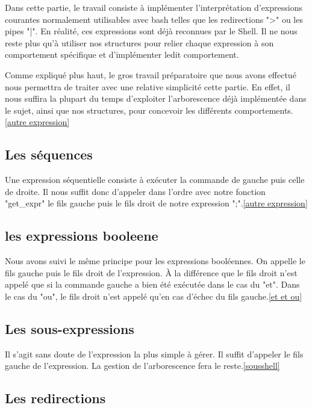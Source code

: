 \documentclass[12pt]{article}
\begin{document}
Dans cette partie, le travail consiste à implémenter l'interprétation d'expressions courantes
normalement utilisables avec bash telles que les redirections ">" ou les pipes "|".
En réalité, ces expressions sont déjà reconnues par le Shell. Il ne nous reste plus qu'à utiliser
nos structures pour relier chaque expression à son comportement spécifique et d'implémenter ledit comportement.

Comme expliqué plus haut, le gros travail préparatoire que nous avons effectué nous permettra
de traiter avec une relative simplicité cette partie. En effet, il nous suffira la plupart du temps 
d'exploiter l'arborescence déjà implémentée dans le sujet, ainsi que nos structures, pour concevoir
les différents comportements.\ref{autre expression}

\subsection{Les séquences}

Une expression séquentielle consiste à exécuter la commande de gauche puis celle de droite.
Il nous suffit donc d'appeler dans l'ordre avec notre fonction "get\_expr" le fils gauche puis le fils
droit de notre expression ";".\ref{autre expression}

\subsection{les expressions booleene}

Nous avons suivi le même principe pour les expressions booléennes. On appelle le fils gauche puis
le fils droit de l'expression.
À la différence que le fils droit n'est appelé que si la commande gauche a bien été exécutée dans le
cas du "et". Dans le cas du "ou", le fils droit n'est appelé qu’en cas d'échec du fils gauche.\ref{et et ou}

\subsection{Les sous-expressions}

Il s'agit sans doute de l'expression la plus simple à gérer. Il suffit d'appeler le fils
gauche de l'expression. La gestion de l'arborescence fera le reste.\ref{sousshell}

\subsection{Les redirections}
\end{document}
